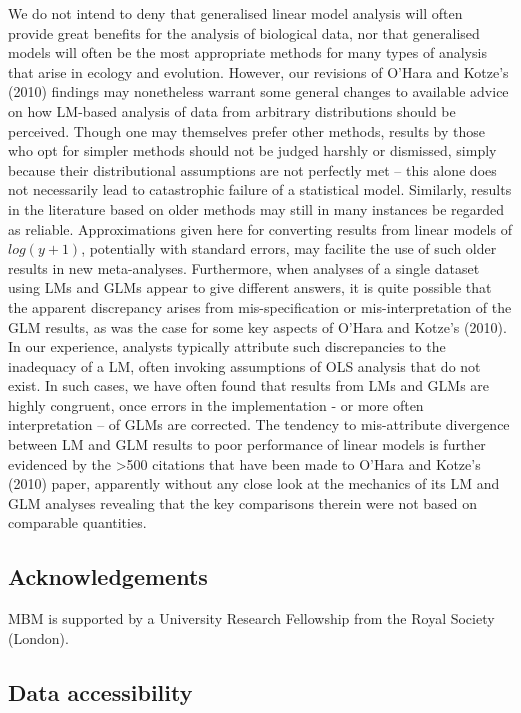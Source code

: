 \documentclass[]{article}
\begin{document}
We do not intend to deny that generalised linear model analysis will
often provide great benefits for the analysis of biological data, nor
that generalised models will often be the most appropriate methods for
many types of analysis that arise in ecology and evolution. However, our
revisions of O'Hara and Kotze's (2010) findings may nonetheless warrant
some general changes to available advice on how LM-based analysis of
data from arbitrary distributions should be perceived. Though one may
themselves prefer other methods, results by those who opt for simpler
methods should not be judged harshly or dismissed, simply because their
distributional assumptions are not perfectly met -- this alone does not
necessarily lead to catastrophic failure of a statistical model.
Similarly, results in the literature based on older methods may still in
many instances be regarded as reliable. Approximations given here for
converting results from linear models of \(log(y+1)\), potentially with
standard errors, may facilite the use of such older results in new
meta-analyses. Furthermore, when analyses of a single dataset using LMs
and GLMs appear to give different answers, it is quite possible that the
apparent discrepancy arises from mis-specification or mis-interpretation
of the GLM results, as was the case for some key aspects of O'Hara and
Kotze's (2010). In our experience, analysts typically attribute such
discrepancies to the inadequacy of a LM, often invoking assumptions of
OLS analysis that do not exist. In such cases, we have often found that
results from LMs and GLMs are highly congruent, once errors in the
implementation - or more often interpretation -- of GLMs are corrected.
The tendency to mis-attribute divergence between LM and GLM results to
poor performance of linear models is further evidenced by the
\textgreater{}500 citations that have been made to O'Hara and Kotze's
(2010) paper, apparently without any close look at the mechanics of its
LM and GLM analyses revealing that the key comparisons therein were not
based on comparable quantities.

\subsection{Acknowledgements}\label{acknowledgements}

MBM is supported by a University Research Fellowship from the Royal
Society (London).

\subsection{Data accessibility}\label{data-accessibility}
\end{document}
